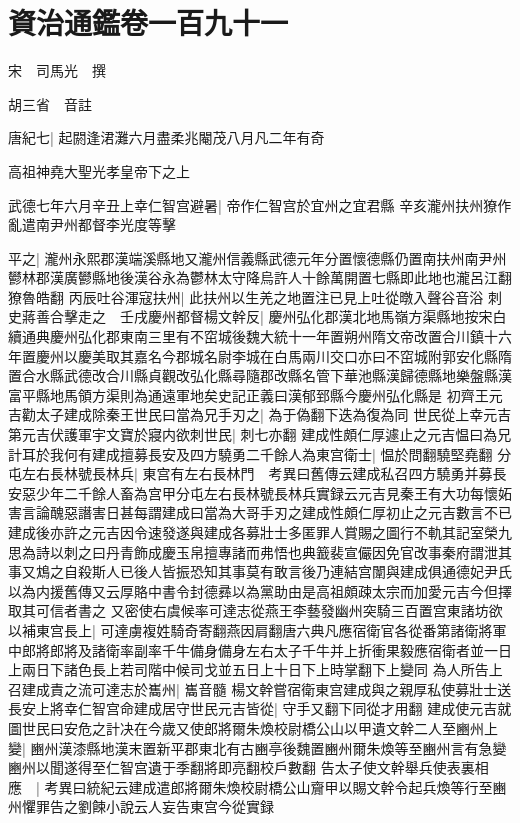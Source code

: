 \chapter{資治通鑑卷一百九十一}
宋　司馬光　撰

胡三省　音註

唐紀七|{
	起閼逢涒灘六月盡柔兆閹茂八月凡二年有奇}


高祖神堯大聖光孝皇帝下之上

武德七年六月辛丑上幸仁智宫避暑|{
	帝作仁智宫於宜州之宜君縣}
辛亥瀧州扶州獠作亂遣南尹州都督李光度等擊

平之|{
	瀧州永熙郡漢端溪縣地又瀧州信義縣武德元年分置懷德縣仍置南扶州南尹州鬰林郡漢廣鬰縣地後漢谷永為鬱林太守降烏許人十餘萬開置七縣即此地也瀧呂江翻獠魯皓翻}
丙辰吐谷渾寇扶州|{
	此扶州以生羌之地置注已見上吐從暾入聲谷音浴}
刺史蔣善合擊走之　壬戌慶州都督楊文幹反|{
	慶州弘化郡漢北地馬嶺方渠縣地按宋白續通典慶州弘化郡東南三里有不窋城後魏大統十一年置朔州隋文帝改置合川鎮十六年置慶州以慶美取其嘉名今郡城名尉李城在白馬兩川交口亦曰不窋城附郭安化縣隋置合水縣武德改合川縣貞觀改弘化縣尋隨郡改縣名管下華池縣漢歸德縣地樂盤縣漢富平縣地馬領方渠則為通遠軍地矣史記正義曰漢郁郅縣今慶州弘化縣是}
初齊王元吉勸太子建成除秦王世民曰當為兄手刃之|{
	為于偽翻下迭為復為同}
世民從上幸元吉第元吉伏護軍宇文寶於寢内欲刺世民|{
	刺七亦翻}
建成性頗仁厚遽止之元吉愠曰為兄計耳於我何有建成擅募長安及四方驍勇二千餘人為東宫衛士|{
	愠於問翻驍堅堯翻}
分屯左右長林號長林兵|{
	東宫有左右長林門　考異曰舊傳云建成私召四方驍勇并募長安惡少年二千餘人畜為宫甲分屯左右長林號長林兵實録云元吉見秦王有大功每懷妬害言論醜惡譖害日甚每謂建成曰當為大哥手刃之建成性頗仁厚初止之元吉數言不已建成後亦許之元吉因令速發遂與建成各募壯士多匿罪人賞賜之圖行不軌其記室榮九思為詩以刺之曰丹青飾成慶玉帛擅專諸而弗悟也典籖裴宣儼因免官改事秦府謂泄其事又鴆之自殺斯人已後人皆振恐知其事莫有敢言後乃連結宫闈與建成俱通德妃尹氏以為内援舊傳又云厚賂中書令封德彞以為黨助由是高祖頗疎太宗而加愛元吉今但擇取其可信者書之}
又密使右虞候率可達志從燕王李藝發幽州突騎三百置宫東諸坊欲以補東宫長上|{
	可達虜複姓騎奇寄翻燕因肩翻唐六典凡應宿衛官各從番第諸衛將軍中郎將郎將及諸衛率副率千牛備身備身左右太子千牛并上折衝果毅應宿衛者並一日上兩日下諸色長上若司階中候司戈並五日上十日下上時掌翻下上變同}
為人所告上召建成責之流可達志於巂州|{
	巂音髓}
楊文幹嘗宿衛東宫建成與之親厚私使募壯士送長安上將幸仁智宫命建成居守世民元吉皆從|{
	守手又翻下同從才用翻}
建成使元吉就圖世民曰安危之計决在今歲又使郎將爾朱煥校尉橋公山以甲遺文幹二人至豳州上變|{
	豳州漢漆縣地漢末置新平郡東北有古豳亭後魏置豳州爾朱煥等至豳州言有急變豳州以聞遂得至仁智宫遺于季翻將即亮翻校戶數翻}
告太子使文幹舉兵使表裏相應　|{
	考異曰統紀云建成遣郎將爾朱煥校尉橋公山齎甲以賜文幹令起兵煥等行至豳州懼罪告之劉餗小說云人妄告東宫今從實録}
